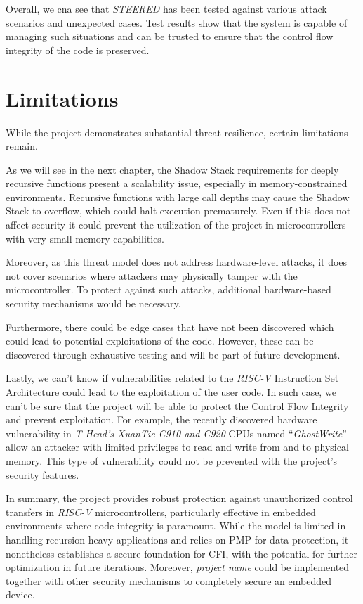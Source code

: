 Overall, we cna see that \textit{STEERED} has been tested against various attack
scenarios and unexpected cases. Test results show that the system is capable of
managing such situations and can be trusted to ensure that the control flow
integrity of the code is preserved.

\section{Limitations}
\label{sec:ta_limitations}

While the project demonstrates substantial threat resilience, certain
limitations remain.

As we will see in the next chapter, the Shadow Stack requirements for deeply recursive
functions present a scalability issue, especially in memory-constrained
environments. Recursive functions with large call depths may cause the Shadow Stack
to overflow, which could halt execution prematurely. Even if this does not affect
security it could prevent the utilization of the project in microcontrollers with
very small memory capabilities.

Moreover, as this threat model does not address hardware-level attacks, it does not
cover scenarios where attackers may physically tamper with the microcontroller.
To protect against such attacks, additional hardware-based security mechanisms would
be necessary.

Furthermore, there could be edge cases that have not been discovered which could
lead to potential exploitations of the code. However, these can be discovered
through exhaustive testing and will be part of future development.

Lastly, we can't know if vulnerabilities related to the \textit{RISC-V}
Instruction Set Architecture could lead to the exploitation of the user code. In
such case, we can't be sure that the project will be able to protect the Control
Flow Integrity and prevent exploitation. For example, the recently discovered
hardware vulnerability in \textit{T-Head's XuanTie C910 and C920} CPUs named ``\textit{GhostWrite}''
\cite{riscvuzz} allow an attacker with limited privileges to read and write from
and to physical memory. This type of vulnerability could not be prevented with the
project's security features.

In summary, the project provides robust protection against unauthorized control
transfers in \textit{RISC-V} microcontrollers, particularly effective in
embedded environments where code integrity is paramount. While the model is limited
in handling recursion-heavy applications and relies on PMP for data protection,
it nonetheless establishes a secure foundation for CFI, with the potential for further
optimization in future iterations. Moreover, \textit{project name} could be
implemented together with other security mechanisms to completely secure an
embedded device.
